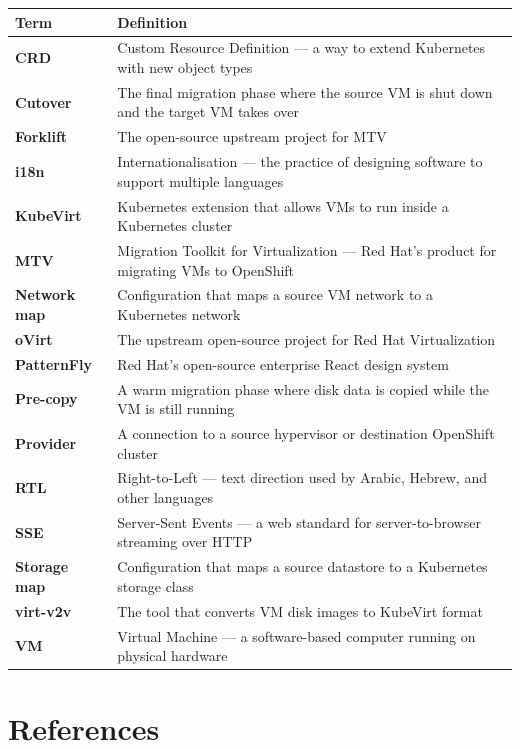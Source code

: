 \documentclass[12pt,a4paper]{article}
\begin{document}
\begin{longtable}{L{3.5cm} L{10.5cm}}
  \toprule
  \textbf{Term} & \textbf{Definition} \\
  \midrule
  \endhead
  \textbf{CRD} & Custom Resource Definition — a way to extend Kubernetes with new object types \\
  \textbf{Cutover} & The final migration phase where the source VM is shut down and the target VM takes over \\
  \textbf{Forklift} & The open-source upstream project for MTV \\
  \textbf{i18n} & Internationalisation — the practice of designing software to support multiple languages \\
  \textbf{KubeVirt} & Kubernetes extension that allows VMs to run inside a Kubernetes cluster \\
  \textbf{MTV} & Migration Toolkit for Virtualization — Red Hat's product for migrating VMs to OpenShift \\
  \textbf{Network map} & Configuration that maps a source VM network to a Kubernetes network \\
  \textbf{oVirt} & The upstream open-source project for Red Hat Virtualization \\
  \textbf{PatternFly} & Red Hat's open-source enterprise React design system \\
  \textbf{Pre-copy} & A warm migration phase where disk data is copied while the VM is still running \\
  \textbf{Provider} & A connection to a source hypervisor or destination OpenShift cluster \\
  \textbf{RTL} & Right-to-Left — text direction used by Arabic, Hebrew, and other languages \\
  \textbf{SSE} & Server-Sent Events — a web standard for server-to-browser streaming over HTTP \\
  \textbf{Storage map} & Configuration that maps a source datastore to a Kubernetes storage class \\
  \textbf{virt-v2v} & The tool that converts VM disk images to KubeVirt format \\
  \textbf{VM} & Virtual Machine — a software-based computer running on physical hardware \\
  \bottomrule
\end{longtable}

\section{References}
\end{document}
